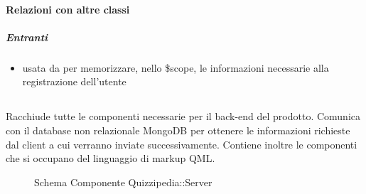 \paragraph{Relazioni con altre classi}
\subparagraph{Entranti}
\begin{itemize}
\item usata da  per memorizzare, nello \$scope, le informazioni necessarie alla registrazione dell'utente
\end{itemize}
\subsection{}
Racchiude tutte le componenti necessarie per il back-end del prodotto. Comunica con il database non relazionale MongoDB per ottenere le informazioni richieste dal client a cui verranno inviate successivamente.
Contiene inoltre le componenti che si occupano del linguaggio di markup QML.
\begin{figure}[H]
\centering
\noindent{}
\caption[Schema Componente Server]{Schema Componente Quizzipedia::Server}
\end{figure}
